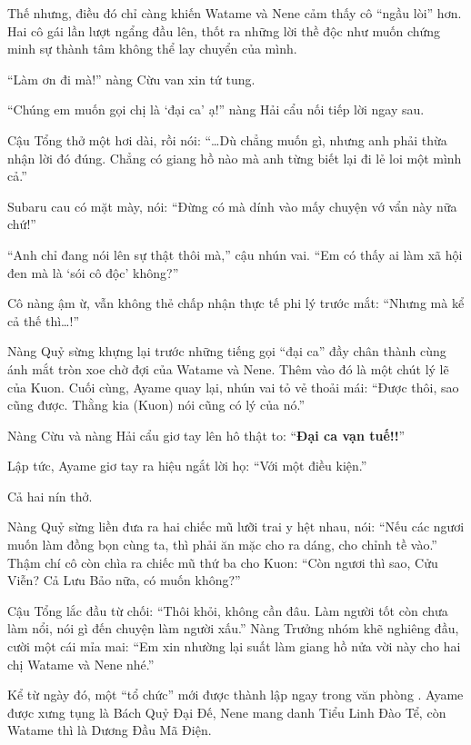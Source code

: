 \documentclass[../main.tex]{subfiles}
\begin{document}
Thế nhưng, điều đó chỉ càng khiến Watame và Nene cảm thấy cô ``ngầu lòi'' hơn. Hai cô gái lần lượt ngẩng đầu lên, thốt ra những lời thề độc như muốn chứng minh sự thành tâm không thể lay chuyển của mình.

``Làm ơn đi mà!'' nàng Cừu van xin tứ tung.

``Chúng em muốn gọi chị là `đại ca' ạ!'' nàng Hải cẩu nối tiếp lời ngay sau.


Cậu Tổng thở một hơi dài, rồi nói: ``\dots Dù chẳng muốn gì, nhưng anh phải thừa nhận lời đó đúng. Chẳng có giang hồ nào mà anh từng biết lại đi lẻ loi một mình cả.''

Subaru cau có mặt mày, nói: ``Đừng có mà dính vào mấy chuyện vớ vẩn này nữa chứ!''

``Anh chỉ đang nói lên sự thật thôi mà,'' cậu nhún vai. ``Em có thấy ai làm xã hội đen mà là `sói cô độc' không?''

Cô nàng ậm ừ, vẫn không thẻ chấp nhận thực tế phi lý trước mắt: ``Nhưng mà kể cả thế thì\dots!''

Nàng Quỷ sừng khựng lại trước những tiếng gọi ``đại ca'' đầy chân thành cùng ánh mắt tròn xoe chờ đợi của Watame và Nene. Thêm vào đó là một chút lý lẽ của Kuon. Cuối cùng, Ayame quay lại, nhún vai tỏ vẻ thoải mái: ``Được thôi, sao cũng được. Thằng kia (Kuon) nói cũng có lý của nó.''

Nàng Cừu và nàng Hải cẩu giơ tay lên hô thật to: ``\textbf{Đại ca vạn tuế!!}''

Lập tức, Ayame giơ tay ra hiệu ngắt lời họ: ``Với một điều kiện.''

Cả hai nín thở.

Nàng Quỷ sừng liền đưa ra hai chiếc mũ lưỡi trai y hệt nhau, nói: ``Nếu các ngươi muốn làm đồng bọn cùng ta, thì phải ăn mặc cho ra dáng, cho chỉnh tề vào.'' Thậm chí cô còn chìa ra chiếc mũ thứ ba cho Kuon: ``Còn ngươi thì sao, Cửu Viễn? Cả Lưu Bảo nữa, có muốn không?''

Cậu Tổng lắc đầu từ chối: ``Thôi khỏi, không cần đâu. Làm người tốt còn chưa làm nổi, nói gì đến chuyện làm người xấu.'' Nàng Trưởng nhóm khẽ nghiêng đầu, cười một cái mỉa mai: ``Em xin nhường lại suất làm giang hồ nửa vời này cho hai chị Watame và Nene nhé.''

Kể từ ngày đó, một ``tổ chức'' mới được thành lập ngay trong văn phòng \hll. Ayame được xưng tụng là Bách Quỷ Đại Đế, Nene mang danh Tiểu Linh Đào Tể, còn Watame thì là Dương Đầu Mã Điện.

\end{document}
